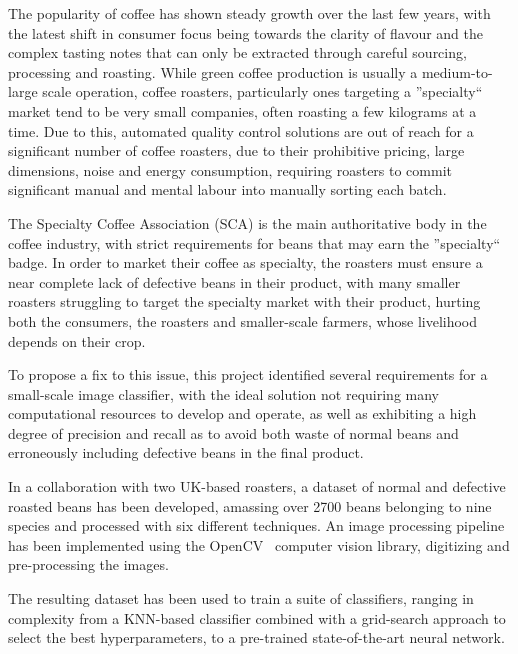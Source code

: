 The popularity of coffee has shown steady growth over the last few years, with
the latest shift in consumer focus being towards the clarity of flavour and the complex tasting notes that
can only be extracted through careful sourcing, processing and roasting.
While green coffee production is usually a medium-to-large scale operation, coffee roasters, particularly ones targeting a
''specialty`` market tend to be very small companies, often roasting a few kilograms at a time.
Due to this, automated quality control solutions are out of reach for a significant number of coffee roasters,
due to their prohibitive pricing, large dimensions, noise and energy consumption, requiring roasters to commit
significant manual and mental labour into manually sorting each batch.

The Specialty Coffee Association (SCA) is the main authoritative body in the coffee industry, with strict requirements
for beans that may earn the ''specialty`` badge.
In order to market their coffee as specialty, the roasters must ensure a near complete lack of defective beans in their
product, with many smaller roasters struggling to target the specialty market with
their product, hurting both the consumers, the roasters and smaller-scale farmers, whose livelihood depends on their crop.

To propose a fix to this issue, this project identified several requirements for a small-scale image classifier,
with the ideal solution not requiring many computational resources to develop and operate, as well as exhibiting a high degree
of precision and recall as to avoid both waste of normal beans and erroneously including defective beans in the final product.

In a collaboration with two UK-based roasters, a dataset of normal and defective roasted beans has been developed, amassing
over 2700 beans belonging to nine species and processed with six different techniques.
An image processing pipeline has been implemented using the OpenCV~\cite{opencvLibrary} computer vision library, digitizing and pre-processing the images.

The resulting dataset has been used to train a suite of classifiers, ranging in complexity from a KNN-based classifier combined with a grid-search
approach to select the best hyperparameters, to a pre-trained state-of-the-art neural network.

